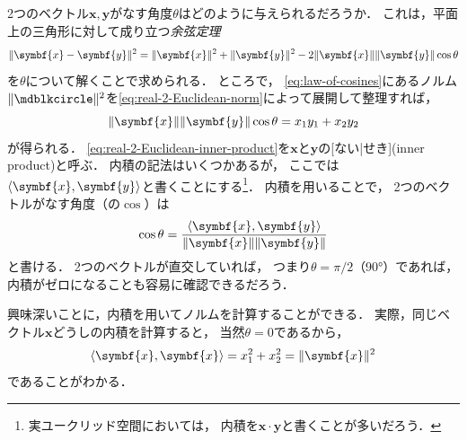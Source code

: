 \documentclass[
]{sotsu}
\begin{document}
2つのベクトル$\symbf{x}, \symbf{y}$がなす角度$\theta$はどのように与えられるだろうか．
これは，平面上の三角形に対して成り立つ\emph{余弦定理}
\begin{equation}
    \label{eq:law-of-cosines}
    \norm{\symbf{x} - \symbf{y}}^2 
        = \norm{\symbf{x}}^2 + \norm{\symbf{y}}^2 - 2 \norm{\symbf{x}} \norm{\symbf{y}} \cos \theta
\end{equation}
を$\theta$について解くことで求められる．
ところで，
\cref{eq:law-of-cosines}にあるノルム$\norm{\bigdot}^2$を\cref{eq:real-2-Euclidean-norm}によって展開して整理すれば，
\begin{equation}
    \label{eq:real-2-Euclidean-inner-product}
    \norm{\symbf{x}} \norm{\symbf{y}} \cos \theta = x_1 y_1 + x_2 y_2
\end{equation}
が得られる．
\cref{eq:real-2-Euclidean-inner-product}を$\symbf{x}$と$\symbf{y}$の[ない|せき](inner product)と呼ぶ．
内積の記法はいくつかあるが，
ここでは$\iparen{\symbf{x}, \symbf{y}}$と書くことにする\footnote{
    実ユークリッド空間においては，
    内積を$\symbf{x} \cdotp \symbf{y}$と書くことが多いだろう．
}．
内積を用いることで，
2つのベクトルがなす角度（の$\cos$）は
\begin{equation}
    \label{eq:real-2-Euclidean-vector-angle}
    \cos \theta = \frac{\iparen{\symbf{x}, \symbf{y}}}{\norm{\symbf{x}} \norm{\symbf{y}}}
\end{equation}
と書ける．
2つのベクトルが直交していれば，
つまり$\theta = \pi / 2$（90°）であれば，
内積がゼロになることも容易に確認できるだろう．

興味深いことに，内積を用いてノルムを計算することができる．
実際，同じベクトル$\symbf{x}$どうしの内積を計算すると，
当然$\theta = 0$であるから，
\begin{equation}
    \label{eq:real-2-Euclidean-inner-product-vs-norm}
    \iparen{\symbf{x}, \symbf{x}} = x_1^2 + x_2^2 = \norm{\symbf{x}}^2
\end{equation}
であることがわかる．
\end{document}
